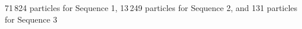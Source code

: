 71\,824 particles for Sequence 1, 13\,249 particles for Sequence 2, and 131 particles for Sequence 3%
